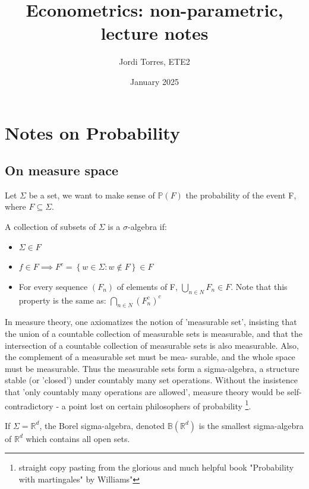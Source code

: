 \documentclass{article}
\title{Econometrics: non-parametric, lecture notes}
\author{Jordi Torres, ETE2}
\date{January 2025}
\begin{document}
\maketitle

\section{Notes on Probability}

\subsection{On measure space}

Let \(\Sigma\) be a set, we want to make sense of $\mathbb{P}(F)$ the probability of the event F, where \(F\subseteq\Sigma\).



\begin{definition}
A collection of subsets of \(\Sigma\) is a \(\sigma\)-algebra if:
\begin{itemize}
    \item \(\Sigma \in F\)
    \item \( f \in F \implies F^{c}=\left\{w \in \Sigma : w \notin F\right\}\in F\)
    \item For every sequence \((F_{n})\) of elements of F, \(\bigcup_{n \in N}F_{n} \in F\). Note that this property is the same as: \(\bigcap_{n \in N}(F_{n}^{c})^{c}\) 
\end{itemize}
\end{definition}

\begin{remark}
    In measure theory, one axiomatizes the notion of 'measurable set', insisting that the union of a countable collection of measurable sets is measurable, and that the intersection of a countable collection of measurable sets is also measurable. Also, the complement of a measurable set must be mea- surable, and the whole space must be measurable. Thus the measurable sets form a sigma-algebra, a structure stable (or 'closed') under countably many set operations. Without the insistence that 'only countably many operations are allowed', measure theory would be self-contradictory - a point lost on certain philosophers of probability \footnote{straight copy pasting from the glorious and much helpful book "Probability with martingales" by Williams"}.
\end{remark}
\begin{example}
    If \(\Sigma=\mathbb{R}^{d}\), the Borel sigma-algebra, denoted \(\mathbb{B}(\mathbb{R}^{d})\) is the smallest sigma-algebra of \(\mathbb{R}^{d}\) which contains all open sets. 
\end{example}
\end{document}
